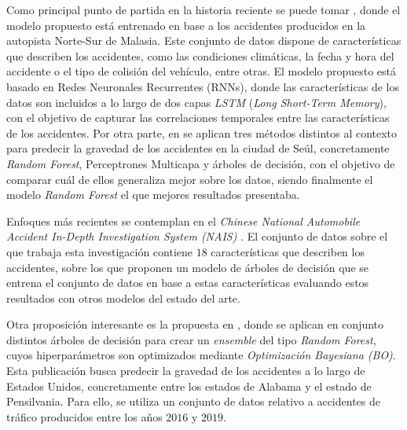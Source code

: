 Como principal punto de partida en la historia reciente se puede tomar \cite{app7060476}, donde el modelo propuesto está entrenado en base a los accidentes producidos en la autopista Norte-Sur de Malasia. Este conjunto de datos dispone de características que describen los accidentes, como las condiciones climáticas, la fecha y hora del accidente o el tipo de colisión del vehículo, entre otras. El modelo propuesto está basado en Redes Neuronales Recurrentes (RNNs), donde las características de los datos son incluidos a lo largo de dos capas \textit{LSTM} (\textit{Long Short-Term Memory}), con el objetivo de capturar las correlaciones temporales entre las características de los accidentes. Por otra parte, en \cite{app10010129} se aplican tres métodos distintos al contexto para predecir la gravedad de los accidentes en la ciudad de Seúl, concretamente \textit{Random Forest}, Perceptrones Multicapa y árboles de decisión, con el objetivo de comparar cuál de ellos generaliza mejor sobre los datos, siendo finalmente el modelo \textit{Random Forest} el que mejores resultados presentaba.

Enfoques más recientes se contemplan en el \textit{Chinese National Automobile Accident In-Depth Investigation System (NAIS)} \cite{Yang2023}. El conjunto de datos sobre el que trabaja esta investigación contiene $18$ características que describen los accidentes, sobre los que proponen un modelo de árboles de decisión que se entrena el conjunto de datos en base a estas características evaluando estos resultados con otros modelos del estado del arte.

Otra proposición interesante es la propuesta en \cite{su14031729}, donde se aplican en conjunto distintos árboles de decisión para crear un \textit{ensemble} del tipo \textit{Random Forest}, cuyos hiperparámetros son optimizados mediante \textit{Optimización Bayesiana (BO)}. Esta publicación busca predecir la gravedad de los accidentes a lo largo de Estados Unidos, concretamente entre los estados de Alabama y el estado de Pensilvania. Para ello, se utiliza un conjunto de datos relativo a accidentes de tráfico producidos entre los años $2016$ y $2019$.

